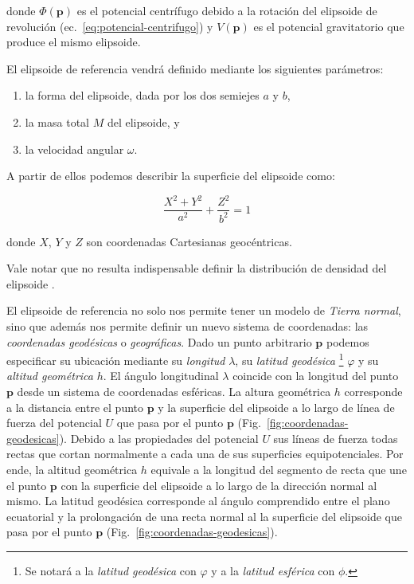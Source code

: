 \noindent donde $\Phi(\mathbf{p})$ es el potencial centrífugo debido a la
rotación del elipsoide de revolución (ec.~\ref{eq:potencial-centrifugo})
y $V(\mathbf{p})$ es el potencial gravitatorio que produce el mismo elipsoide.

El elipsoide de referencia vendrá definido mediante los siguientes parámetros:

\begin{enumerate}
    \item{la forma del elipsoide, dada por los dos semiejes $a$ y $b$,}
    \item{la masa total $M$ del elipsoide, y}
    \item{la velocidad angular $\omega$.}
\end{enumerate}

\noindent A partir de ellos podemos describir la superficie del elipsoide como:

\begin{equation}
    \frac{X^2 + Y^2}{a^2} + \frac{Z^2}{b^2} = 1
\end{equation}

\noindent donde $X$, $Y$ y $Z$ son coordenadas Cartesianas geocéntricas.

Vale notar que no resulta indispensable definir la distribución de densidad del
elipsoide \citep[][p.~64]{heiskanen1967}.

El elipsoide de referencia no solo nos permite tener un modelo de \emph{Tierra
normal}, sino que además nos permite definir un nuevo sistema de coordenadas:
las \emph{coordenadas geodésicas} o \emph{geográficas}.
Dado un punto arbitrario $\mathbf{p}$ podemos especificar su ubicación mediante
su \emph{longitud} $\lambda$, su
\emph{latitud geodésica} \footnote{
    Se notará a la \emph{latitud geodésica} con $\varphi$ y a la \emph{latitud
    esférica} con $\phi$.
}
$\varphi$ y su \emph{altitud geométrica} $h$.
El ángulo longitudinal $\lambda$ coincide con la longitud del punto
$\mathbf{p}$ desde un sistema de coordenadas esféricas.
La altura geométrica $h$ corresponde a la distancia entre el punto $\mathbf{p}$
y la superficie del elipsoide a lo largo de línea de fuerza del potencial $U$
que pasa por el punto $\mathbf{p}$ (Fig.~\ref{fig:coordenadas-geodesicas}).
Debido a las propiedades del potencial $U$ sus líneas de fuerza todas
rectas que cortan normalmente a cada una de sus superficies equipotenciales.
Por ende, la altitud geométrica $h$ equivale a la longitud del segmento de
recta que une el punto $\mathbf{p}$ con la superficie del elipsoide a lo largo
de la dirección normal al mismo.
La latitud geodésica corresponde al ángulo comprendido entre el plano
ecuatorial y la prolongación de una recta normal al la superficie del elipsoide
que pasa por el punto $\mathbf{p}$ (Fig.~\ref{fig:coordenadas-geodesicas}).

